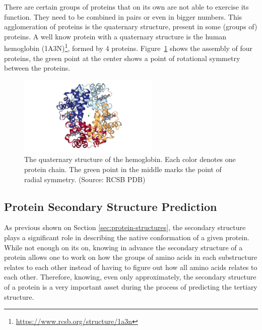 
There are certain groups of proteins that on its own are not able to exercise
its function. They need to be combined in pairs or even in bigger numbers. This
agglomeration of proteins is the quaternary structure, present in some (groups
of) proteins. A well know protein with a quaternary structure is the human
hemoglobin (1A3N)\footnote{\url{https://www.rcsb.org/structure/1a3n}}, formed
by 4 proteins. Figure~\ref{fig:human-hemoglobin} shows the assembly of four
proteins, the green point at the center shows a point of rotational symmetry
between the proteins.

\begin{figure}
    \centering
    \includegraphics[width=0.6\textwidth]{Figuras/1a3n.png}
    \caption{The quaternary structure of the hemoglobin. Each color denotes one protein chain. The green point in the middle marks the point of radial symmetry. (Source: RCSB PDB)}
    \label{fig:human-hemoglobin}
\end{figure}

\subsection{Protein Secondary Structure Prediction}
\label{sec:secondary-structure-prediction}

As previous shown on Section \ref{sec:protein-structures}, the secondary
structure plays a significant role in describing the native conformation of a
given protein. While not enough on its on, knowing in advance the secondary
structure of a protein allows one to work on how the groups of amino acids in
each substructure relates to each other instead of having to figure out how all
amino acids relates to each other. Therefore, knowing, even only approximately,
the secondary structure of a protein is a very important asset during the
process of predicting the tertiary structure.

